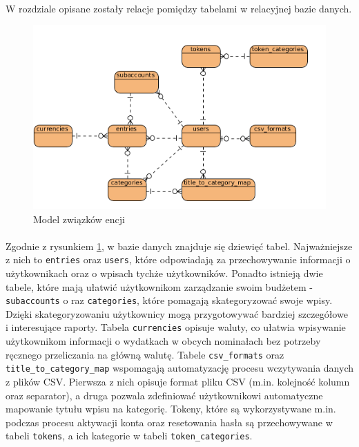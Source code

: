\documentclass{article}
\begin{document}
	\paragraph{} W rozdziale opisane zostały relacje pomiędzy tabelami w relacyjnej bazie danych. 
	\begin{figure}[H]
		\centering
		\includegraphics[width=0.8\linewidth]{assets/erd.png}
		\caption[]{Model związków encji}
		\label{fig:erd}
	\end{figure}
	
	\paragraph{} Zgodnie z rysunkiem \ref{fig:erd}, w bazie danych znajduje się dziewięć tabel. Najważniejsze z nich to \texttt{entries} oraz \texttt{users}, które odpowiadają za przechowywanie informacji o użytkownikach oraz o wpisach tychże użytkowników. Ponadto istnieją dwie tabele, które mają ułatwić użytkownikom zarządzanie swoim budżetem - \texttt{subaccounts} o raz \texttt{categories}, które pomagają skategoryzować swoje wpisy. Dzięki skategoryzowaniu użytkownicy mogą przygotowywać bardziej szczegółowe i interesujące raporty. Tabela \texttt{currencies} opisuje waluty, co ułatwia wpisywanie użytkownikom informacji o wydatkach w obcych nominałach bez potrzeby ręcznego przeliczania na główną walutę. Tabele \texttt{csv\_formats} oraz \texttt{title\_to\_category\_map} wspomagają automatyzację procesu wczytywania danych z plików CSV. Pierwsza z nich opisuje format pliku CSV (m.in. kolejność kolumn oraz separator), a druga pozwala zdefiniować użytkownikowi automatyczne mapowanie tytułu wpisu na kategorię. Tokeny, które są wykorzystywane m.in. podczas procesu aktywacji konta oraz resetowania hasła są przechowywane w tabeli \texttt{tokens}, a ich kategorie w tabeli \texttt{token\_categories}.
\end{document}
